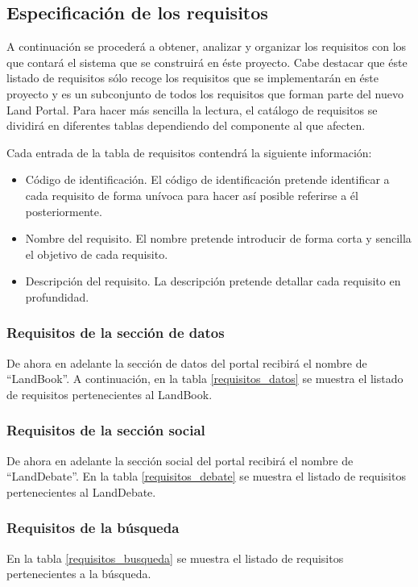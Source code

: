 \subsection{Especificación de los requisitos}
A continuación se procederá a obtener, analizar y organizar los requisitos con los que contará el sistema que se construirá en éste proyecto.  Cabe destacar que éste listado de requisitos sólo recoge los requisitos que se implementarán en éste proyecto y es un subconjunto de todos los requisitos que forman parte del nuevo Land Portal.\newline
Para hacer más sencilla la lectura, el catálogo de requisitos se dividirá en diferentes tablas dependiendo del componente al que afecten.

Cada entrada de la tabla de requisitos contendrá la siguiente información:
\begin{itemize}
\item Código de identificación. El código de identificación pretende identificar a cada requisito de forma unívoca para hacer así posible referirse a él posteriormente.
\item Nombre del requisito. El nombre pretende introducir de forma corta y sencilla el objetivo de cada requisito.
\item Descripción del requisito. La descripción pretende detallar cada requisito en profundidad.
\end{itemize}

\subsubsection{Requisitos de la sección de datos}
\label{requisitos_seccion_datos}
De ahora en adelante la sección de datos del portal recibirá el nombre de ``LandBook''.  A continuación, en la tabla  \ref{requisitos_datos} se muestra el listado de requisitos pertenecientes al LandBook.


\subsubsection{Requisitos de la sección social}
\label{requisitos_seccion_social}
De ahora en adelante la sección social del portal recibirá el nombre de ``LandDebate''.  En la tabla \ref{requisitos_debate} se muestra el listado de requisitos pertenecientes al LandDebate.


\subsubsection{Requisitos de la búsqueda}
En la tabla \ref{requisitos_busqueda} se muestra el listado de requisitos pertenecientes a la búsqueda.


